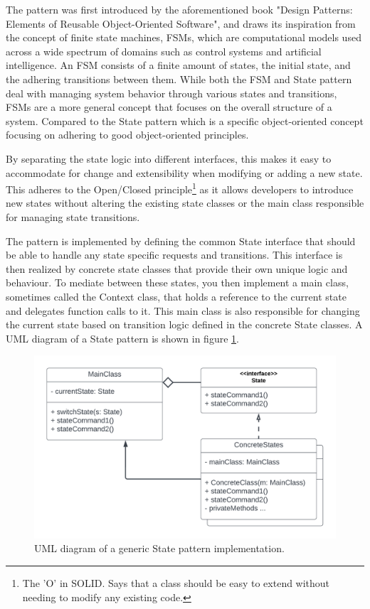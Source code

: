     The pattern was first introduced by the aforementioned book "Design Patterns: Elements of Reusable Object-Oriented Software", and draws its inspiration from the concept of finite state machines, FSMs, which are computational models used across a wide spectrum of domains such as control systems and artificial intelligence. An FSM consists of a finite amount of states, the initial state, and the adhering transitions between them. While both the FSM and State pattern deal with managing system behavior through various states and transitions, FSMs are a more general concept that focuses on the overall structure of a system. Compared to the State pattern which is a specific object-oriented concept focusing on adhering to good object-oriented principles.

    By separating the state logic into different interfaces, this makes it easy to accommodate for change and extensibility when modifying or adding a new state. This adheres to the Open/Closed principle\footnote{The 'O' in SOLID. Says that a class should be easy to extend without needing to modify any existing code.} as it allows developers to introduce new states without altering the existing state classes or the main class responsible for managing state transitions.

    The pattern is implemented by defining the common State interface that should be able to handle any state specific requests and transitions. This interface is then realized by concrete state classes that provide their own unique logic and behaviour. To mediate between these states, you then implement a main class, sometimes called the Context class, that holds a reference to the current state and delegates function calls to it. This main class is also responsible for changing the current state based on transition logic defined in the concrete State classes. A UML diagram of a State pattern is shown in figure \ref{fig:state-observer-uml}.
    
    \begin{figure}[H]
      \centering
      \includegraphics[scale=0.75]{Project_report/figures/theory/design_patterns/state_uml.png}
      \caption{UML diagram of a generic State pattern implementation.}
      \label{fig:state-observer-uml}
    \end{figure}